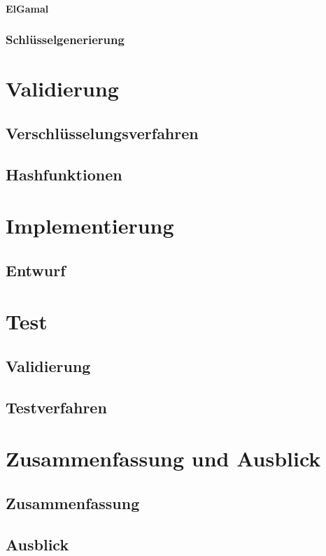 \documentclass[11pt, a4paper]{scrreprt}
\begin{document}
\subsection{ElGamal}
\section{Schlüsselgenerierung}

\part{Validierung}
\chapter{Verschlüsselungsverfahren}
\chapter{Hashfunktionen}

\part{Implementierung}
\chapter{Entwurf}

\part{Test}
\chapter{Validierung}
\chapter{Testverfahren}

\part{Zusammenfassung und Ausblick}
\chapter{Zusammenfassung}
\chapter{Ausblick}

\end{document}
